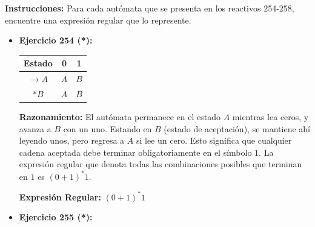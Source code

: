 \documentclass[12pt]{article}
\begin{document}
\textbf{Instrucciones:} Para cada autómata que se presenta en los reactivos 254-258, encuentre una expresión regular que lo represente.

\vspace{0.5cm}

\begin{itemize}
    \item \textbf{Ejercicio 254 (*):}
    
    \begin{minipage}{0.4\textwidth}
    \begin{tabular}{|c|c|c|}
    \hline
    \textbf{Estado} & \textbf{0} & \textbf{1} \\
    \hline
    $\rightarrow A$ & $A$ & $B$ \\
    \hline
    $*B$ & $A$ & $B$ \\
    \hline
    \end{tabular}
    \end{minipage}
    \begin{minipage}{0.5\textwidth}
    \end{minipage}

    \vspace{0.2cm}
    \textbf{Razonamiento:} El autómata permanece en el estado $A$ mientras lea ceros, y avanza a $B$ con un uno. Estando en $B$ (estado de aceptación), se mantiene ahí leyendo unos, pero regresa a $A$ si lee un cero. Esto significa que cualquier cadena aceptada debe terminar obligatoriamente en el símbolo $1$. La expresión regular que denota todas las combinaciones posibles que terminan en $1$ es $(0+1)^*1$.
    
    \textbf{Expresión Regular:} $(0+1)^*1$

    \vspace{0.6cm}

    \item \textbf{Ejercicio 255 (*):}
    

\end{itemize}
\end{document}
